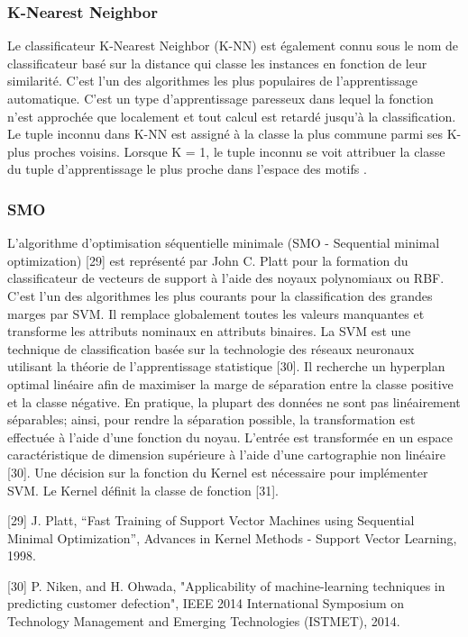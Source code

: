 \subsubsection{K-Nearest Neighbor}
Le classificateur K-Nearest Neighbor (K-NN) \cite{ML00} est également connu sous le nom de classificateur basé sur la distance qui classe les instances en fonction de leur similarité. C'est l'un des algorithmes les plus populaires de l'apprentissage automatique. C'est un type d'apprentissage paresseux dans lequel la fonction n'est approchée que localement et tout calcul est retardé jusqu'à la classification. Le tuple inconnu dans K-NN est assigné à la classe la plus commune parmi ses K-plus proches voisins. Lorsque K = 1, le tuple inconnu se voit attribuer la classe du tuple d'apprentissage le plus proche dans l'espace des motifs \cite{ML01}.

\subsubsection{SMO}
L'algorithme d'optimisation séquentielle minimale (SMO - Sequential minimal optimization) [29] est représenté par John C. Platt pour la formation du classificateur de vecteurs de support à l'aide des noyaux polynomiaux ou RBF. C'est l'un des algorithmes les plus courants pour la classification des grandes marges par SVM. Il remplace globalement toutes les valeurs manquantes et transforme les attributs nominaux en attributs binaires. La SVM est une technique de classification basée sur la technologie des réseaux neuronaux utilisant la théorie de l'apprentissage statistique [30]. Il recherche un hyperplan optimal linéaire afin de maximiser la marge de séparation entre la classe positive et la classe négative. En pratique, la plupart des données ne sont pas linéairement séparables; ainsi, pour rendre la séparation possible, la transformation est effectuée à l'aide d'une fonction du noyau. L'entrée est transformée en un espace caractéristique de dimension supérieure à l'aide d'une cartographie non linéaire [30]. Une décision sur la fonction du Kernel est nécessaire pour implémenter SVM. Le Kernel définit la classe de fonction [31].

[29] J. Platt, “Fast Training of Support Vector Machines using Sequential Minimal Optimization”, Advances in Kernel Methods - Support Vector Learning, 1998.

[30] P. Niken, and H. Ohwada, "Applicability of machine-learning techniques in predicting customer defection", IEEE 2014 International Symposium on Technology Management and Emerging Technologies (ISTMET), 2014.

